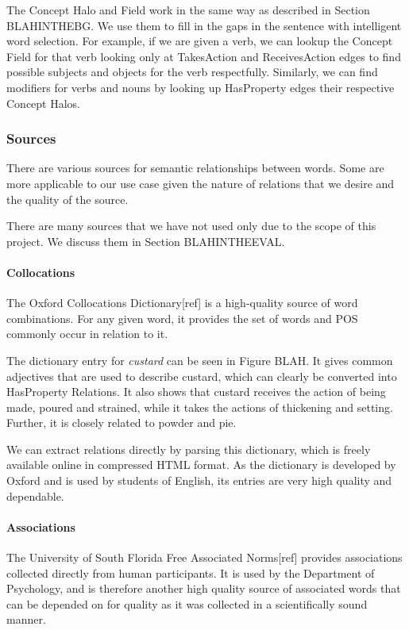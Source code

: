 The Concept Halo and Field work in the same way as described in Section BLAHINTHEBG. We use them to fill in the gaps in the sentence with intelligent word selection. For example, if we are given a verb, we can lookup the Concept Field for that verb looking only at TakesAction and ReceivesAction edges to find possible subjects and objects for the verb respectfully. Similarly, we can find modifiers for verbs and nouns by looking up HasProperty edges their respective Concept Halos.

\subsubsection{Sources}
There are various sources for semantic relationships between words. Some are more applicable to our use case given the nature of relations that we desire and the quality of the source.

There are many sources that we have not used only due to the scope of this project. We discuss them in Section BLAHINTHEEVAL.

\paragraph{Collocations}
The Oxford Collocations Dictionary[ref] is a high-quality source of word combinations. For any given word, it provides the set of words and POS commonly occur in relation to it.

The dictionary entry for \textit{custard} can be seen in Figure BLAH. It gives common adjectives that are used to describe custard, which can clearly be converted into HasProperty Relations. It also shows that custard receives the action of being made, poured and strained, while it takes the actions of thickening and setting. Further, it is closely related to powder and pie.

We can extract relations directly by parsing this dictionary, which is freely available online in compressed HTML format. As the dictionary is developed by Oxford and is used by students of English, its entries are very high quality and dependable.

\paragraph{Associations}
The University of South Florida Free Associated Norms[ref] provides associations collected directly from human participants. It is used by the Department of Psychology, and is therefore another high quality source of associated words that can be depended on for quality as it was collected in a scientifically sound manner.

